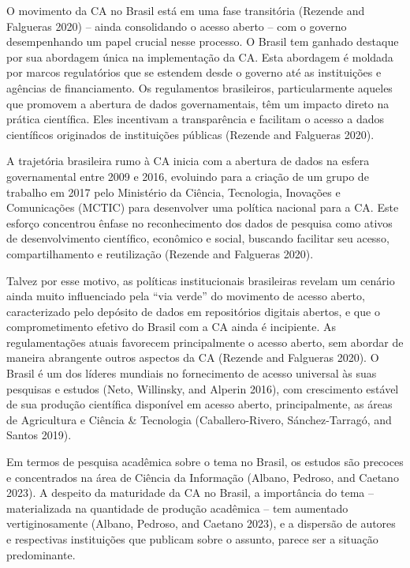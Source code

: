 \documentclass[
  a4paper,
]{article}
\begin{document}
O movimento da CA no Brasil está em uma fase transitória (Rezende and
Falgueras 2020) -- ainda consolidando o acesso aberto -- com o governo
desempenhando um papel crucial nesse processo. O Brasil tem ganhado
destaque por sua abordagem única na implementação da CA. Esta abordagem
é moldada por marcos regulatórios que se estendem desde o governo até as
instituições e agências de financiamento. Os regulamentos brasileiros,
particularmente aqueles que promovem a abertura de dados governamentais,
têm um impacto direto na prática científica. Eles incentivam a
transparência e facilitam o acesso a dados científicos originados de
instituições públicas (Rezende and Falgueras 2020).

A trajetória brasileira rumo à CA inicia com a abertura de dados na
esfera governamental entre 2009 e 2016, evoluindo para a criação de um
grupo de trabalho em 2017 pelo Ministério da Ciência, Tecnologia,
Inovações e Comunicações (MCTIC) para desenvolver uma política nacional
para a CA. Este esforço concentrou ênfase no reconhecimento dos dados de
pesquisa como ativos de desenvolvimento científico, econômico e social,
buscando facilitar seu acesso, compartilhamento e reutilização (Rezende
and Falgueras 2020).

Talvez por esse motivo, as políticas institucionais brasileiras revelam
um cenário ainda muito influenciado pela ``via verde'' do movimento de
acesso aberto, caracterizado pelo depósito de dados em repositórios
digitais abertos, e que o comprometimento efetivo do Brasil com a CA
ainda é incipiente. As regulamentações atuais favorecem principalmente o
acesso aberto, sem abordar de maneira abrangente outros aspectos da CA
(Rezende and Falgueras 2020). O Brasil é um dos líderes mundiais no
fornecimento de acesso universal às suas pesquisas e estudos (Neto,
Willinsky, and Alperin 2016), com crescimento estável de sua produção
científica disponível em acesso aberto, principalmente, as áreas de
Agricultura e Ciência \& Tecnologia (Caballero-Rivero, Sánchez-Tarragó,
and Santos 2019).

Em termos de pesquisa acadêmica sobre o tema no Brasil, os estudos são
precoces e concentrados na área de Ciência da Informação (Albano,
Pedroso, and Caetano 2023). A despeito da maturidade da CA no Brasil, a
importância do tema -- materializada na quantidade de produção acadêmica
-- tem aumentado vertiginosamente (Albano, Pedroso, and Caetano 2023), e
a dispersão de autores e respectivas instituições que publicam sobre o
assunto, parece ser a situação predominante.
\end{document}
